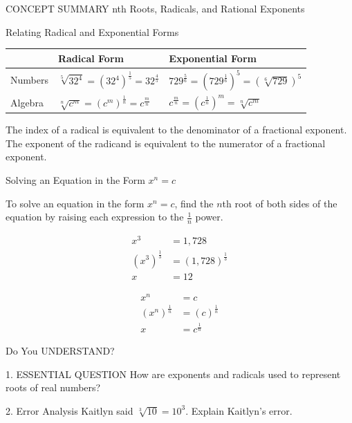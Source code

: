 \documentclass{article}
\newenvironment{concept-summary}{}{}    %
\newcommand{\answer}[1]{}               %
\begin{document}
\begin{concept-summary}
CONCEPT SUMMARY nth Roots, Radicals, and Rational Exponents

Relating Radical and Exponential Forms

\begin{tabular}{lll}
\toprule
 & Radical Form & Exponential Form \\
\midrule
Numbers & \(\sqrt[5]{32^4}=(32^4)^{\frac15}=32^{\frac45}\) & \(729^{\frac56}=(729^{\frac16})^5=(\sqrt[6]{729})^5\) \\
Algebra & \(\sqrt[n]{c^m}=(c^m)^{\frac1n}=c^{\frac mn}\) & \(c^{\frac mn}=(c^{\frac1n})^m=\sqrt[n]{c^m}\) \\
\bottomrule
\end{tabular}

The index of a radical is equivalent to the denominator of a fractional exponent. The exponent of the radicand is equivalent to the numerator of a fractional exponent.

Solving an Equation in the Form \(x^n=c\)

To solve an equation in the form \(x^n=c\), find the \(n\)th root of both sides of the equation by raising each expression to the \(\frac1n\) power.

\[
\begin{aligned}
x^3&=1,728\\
(x^3)^{\frac13}&=(1,728)^{\frac13}\\
x&=12
\end{aligned}
\]

\[
\begin{aligned}
x^n&=c\\
(x^n)^{\frac1n}&=(c)^{\frac1n}\\
x&=c^{\frac1n}
\end{aligned}
\]

Do You UNDERSTAND?

1. ESSENTIAL QUESTION How are exponents and radicals used to represent roots of real numbers?

\answer{A radical can be rewritten as a fractional exponent, where the index is the denominator of the exponent. Both a radical with index \(n\) and a fractional exponent \(\frac1n\) represent the \(n\)th root of a real number.}

2. Error Analysis Kaitlyn said \(\sqrt[3]{10}=10^3\). Explain Kaitlyn's error.

\answer{Kaitlyn made the exponent equal to the index. The index should be the denominator of the exponent, so the exponent should be \(\frac13\).}


\end{concept-summary}
\end{document}
